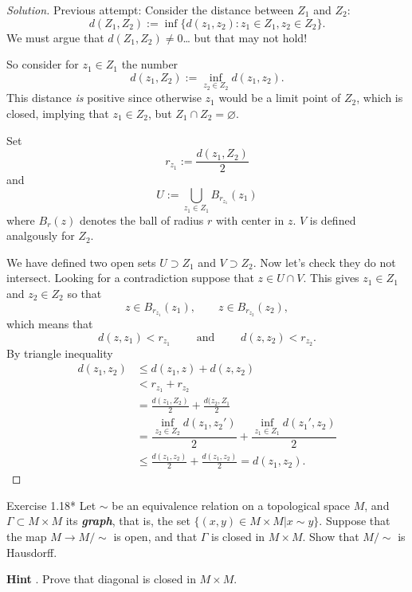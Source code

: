 \begin{proof}[Solution]\leavevmode
	{\color{2}Previous attempt:} Consider the distance between $Z_1$ and $Z_2$:
\[d(Z_1,Z_2):=\operatorname{inf}\{d(z_1,z_2):z_1 \in Z_1, z_2 \in Z_2\}.\]
We must argue that $d(Z_1,Z_2) \neq 0$… {\color{2}but that may not hold!}

So consider for \(z_1\in Z_1\) the number
\[d(z_1,Z_2):=\operatorname{inf}_{z_2\in Z_2}d(z_1,z_2).\]
This distance \textit{is} positive since otherwise \(z_1\) would be a limit point of \(Z_2\), which is closed, implying that \(z_1 \in Z_2\), but \(Z_1 \cap Z_2=\varnothing\).

Set
\[r_{z_1}:=\frac{d(z_1,Z_2)}{2}\]
and
\[U:=\bigcup_{z_1 \in Z_1} B_{r_{z_1}}(z_1)\]
where \(B_r(z)\) denotes the ball of radius  \(r\) with center in  \(z\).  \(V\) is defined analgously for  \(Z_2\).

We have defined two open sets \(U \supset Z_1\) and \(V \supset Z_2\). Now let's check they do not intersect. Looking for a contradiction suppose that \(z \in U \cap V\). This gives \(z_1 \in Z_1\) and \(z_2 \in Z_2\) so that
\[z \in B_{r_{z_1}}(z_1),\qquad z \in B_{r_{z_2}}(z_2),\]
which means that
\[d(z,z_1)<r_{z_1}\qquad \text{ and } \qquad d(z,z_2)<r_{z_2}.\]
By triangle inequality
\begin{align*}
d(z_1,z_2)&\leq d(z_1,z)+d(z,z_2)\\
&<r_{z_1}+r_{z_2}\\
&=\frac{d(z_1,Z_2)}{2}+\frac{d(z_2,Z_1}{2}\\
&=\dfrac{\operatorname{inf}_{z_2 \in Z_2}d(z_1,z_2')}{2}+\dfrac{\operatorname{inf}_{z_1 \in Z_1}d(z_1',z_2)}{2}\\
&\leq \frac{d(z_1,z_2)}{2}+\frac{d(z_1,z_2)}{2}=d(z_1,z_2).
\end{align*}
\end{proof}
\iffalse
\begin{thing4}{Exercise 1.18*}\leavevmode
	Let $\sim$ be an equivalence relation on a topological space $M$, and $\Gamma \subset M \times M$ its \textit{\textbf{graph}}, that is, the set $\{(x,y) \in M \times M|x \sim y\}$. Suppose that the map $M \longrightarrow M/\sim$ is open, and that $\Gamma$ is closed in $M \times M$. Show that $M/\sim$ is Hausdorff.

	\textbf{Hint} . Prove that diagonal is closed in $M \times M$.
\end{thing4}

